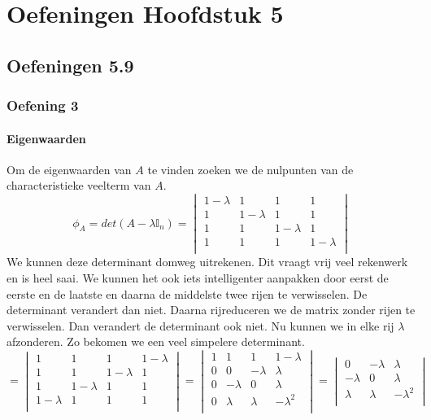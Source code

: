 \documentclass[lineaire_algebra_oplossingen.tex]{subfiles}
\begin{document}
\chapter{Oefeningen Hoofdstuk 5}

\section{Oefeningen 5.9}
\subsection{Oefening 3}
\subsubsection*{Eigenwaarden}
Om de eigenwaarden van $A$ te vinden zoeken we de nulpunten van de characteristieke veelterm van $A$.
\[
\phi_A = det(A-\lambda\mathbb{I}_n) =
\begin{vmatrix}
1-\lambda & 1 & 1 & 1\\
1 & 1-\lambda & 1 & 1\\
1 & 1 & 1-\lambda & 1\\
1 & 1 & 1 & 1-\lambda\\
\end{vmatrix}
\]
We kunnen deze determinant domweg uitrekenen. Dit vraagt vrij veel rekenwerk en is heel saai. We kunnen het ook iets intelligenter aanpakken door eerst de eerste en de laatste en daarna de middelste twee rijen te verwisselen. De determinant verandert dan niet. Daarna rijreduceren we de matrix zonder rijen te verwisselen. Dan verandert de determinant ook niet. Nu kunnen we in elke rij $\lambda$ afzonderen. Zo bekomen we een veel simpelere determinant.
\[
=
\begin{vmatrix}
1 & 1 & 1 & 1-\lambda\\
1 & 1 & 1-\lambda & 1\\
1 & 1-\lambda & 1 & 1\\
1-\lambda & 1 & 1 & 1\\
\end{vmatrix}
=
\begin{vmatrix}
1 & 1 & 1 & 1-\lambda\\
0 & 0 & -\lambda & \lambda\\
0 & -\lambda & 0 & \lambda\\
0 & \lambda & \lambda & -\lambda^2\\
\end{vmatrix}
=
\begin{vmatrix}
0 & -\lambda & \lambda\\
-\lambda & 0 & \lambda\\
\lambda & \lambda & -\lambda^2\\
\end{vmatrix}
\]
\end{document}
